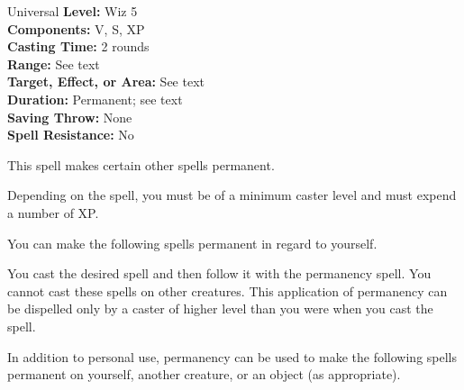 {Universal}
{
	\textbf{Level:}
	Wiz 5\\
	\textbf{Components:}
	V, S, XP\\
	\textbf{Casting Time:}
	2 rounds\\
	\textbf{Range:}
	See text\\
	\textbf{Target, Effect, or Area:}
	See text\\
	\textbf{Duration:}
	Permanent; see text\\
	\textbf{Saving Throw:}
	None\\
	\textbf{Spell Resistance:}
	No\\
}
{
	This spell makes certain other spells permanent.

	Depending on the spell, you must be of a minimum caster level and must expend a number of XP.

	You can make the following spells permanent in regard to yourself.


	You cast the desired spell and then follow it with the permanency spell. You cannot cast these spells on other creatures. This application of permanency can be dispelled only by a caster of higher level than you were when you cast the spell.

	In addition to personal use, permanency can be used to make the following spells permanent on yourself, another creature, or an object (as appropriate).

}
